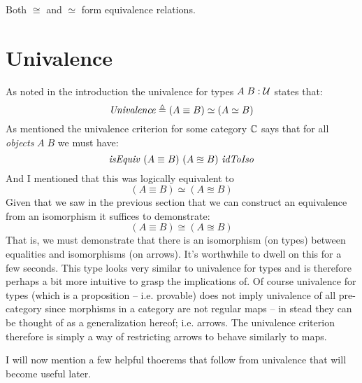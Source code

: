 Both $\cong$ and $\simeq$ form equivalence relations.

\section{Univalence}
\label{sec:univalence}
As noted in the introduction the univalence for types $A\; B \mathrel{:} \mathcal{U}$ states
that:
%
$$
\mathit{Univalence} \mathrel{\triangleq} (A \equiv B) \simeq (A \simeq B)
$$
%
As mentioned the univalence criterion for some category $\mathbb{C}$ says that for all
\emph{objects} $A\;B$ we must have:
$$
\mathit{isEquiv}\ (A \equiv B)\ (A \approxeq B)\ \mathit{idToIso}
$$
And I mentioned that this was logically equivalent to
%
$$
(A \equiv B) \simeq (A \approxeq B)
$$
%
Given that we saw in the previous section that we can construct an equivalence
from an isomorphism it suffices to demonstrate:
%
$$
(A \equiv B) \cong (A \approxeq B)
$$
%
That is, we must demonstrate that there is an isomorphism (on types) between
equalities and isomorphisms (on arrows). It's worthwhile to dwell on this for a
few seconds. This type looks very similar to univalence for types and is
therefore perhaps a bit more intuitive to grasp the implications of. Of course
univalence for types (which is a proposition -- i.e. provable) does not imply
univalence of all pre-category since morphisms in a category are not regular
maps -- in stead they can be thought of as a generalization hereof; i.e. arrows.
The univalence criterion therefore is simply a way of restricting arrows to
behave similarly to maps.

I will now mention a few helpful thoerems that follow from univalence that will
become useful later.

